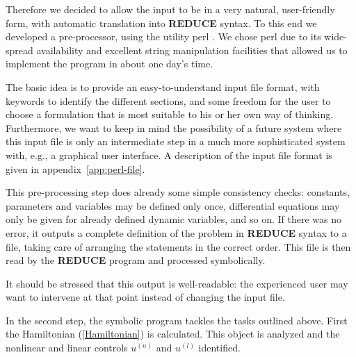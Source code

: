 \documentclass[12pt,a4paper]{article}
\newcommand{\REDUCE}{{\sf\bf REDUCE}}
\newcommand{\perl}{{\sf perl}}
\begin{document}
Therefore we decided to allow the input to be in a very natural,
user-friendly form, with automatic translation into \REDUCE{} syntax.
To this end we developed a pre-processor, using the utility \perl{}
\cite{perl}. We chose \perl{} due to its wide-spread availability and
excellent string manipulation facilities that allowed us to implement
the program in about one day's time.

The basic idea is to provide an easy-to-understand input file format,
with keywords to identify the different sections, and some freedom for
the user to choose a formulation that is most suitable to his or her
own way of thinking. Furthermore, we want to keep in mind the
possibility of a future system where this input file is only an
intermediate step in a much more sophisticated system with, e.g., a
graphical user interface. A description of the input file format is
given in appendix~\ref{app:perl-file}.

This pre-processing step does already some simple consistency checks:
constants, parameters and variables may be defined only once,
differential equations may only be given for already defined dynamic
variables, and so on. If there was no error, it outputs a complete
definition of the problem in \REDUCE{} syntax to a file, taking care
of arranging the statements in the correct order.  This file is
then read by the \REDUCE{} program and processed symbolically.

It should be stressed that this output is well-readable: the
experienced user may want to intervene at that point instead of
changing the input file.

In the second step, the symbolic program tackles the tasks outlined
above.  First the Hamiltonian (\ref{Hamiltonian}) is calculated. This
object is analyzed and the nonlinear and linear controls $u^{(n)}$ and
$u^{(l)}$ identified. 
\end{document}
